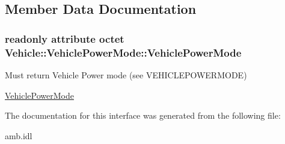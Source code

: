\subsection{Member Data Documentation}
\hypertarget{interfaceVehicle_1_1VehiclePowerMode_aa3dc35878424b72e9a252277bc9b1fb9}{
\subsubsection[{Vehicle\-Power\-Mode}]{\setlength{\rightskip}{0pt plus 5cm}readonly attribute octet Vehicle\-::\-Vehicle\-Power\-Mode\-::\-Vehicle\-Power\-Mode}}\label{interfaceVehicle_1_1VehiclePowerMode_aa3dc35878424b72e9a252277bc9b1fb9}


Must return Vehicle Power mode (see V\-E\-H\-I\-C\-L\-E\-P\-O\-W\-E\-R\-M\-O\-D\-E) 

\hyperlink{interfaceVehicle_1_1VehiclePowerMode}{Vehicle\-Power\-Mode} 

The documentation for this interface was generated from the following file\-:\begin{DoxyCompactItemize}
\item 
amb.\-idl\end{DoxyCompactItemize}
